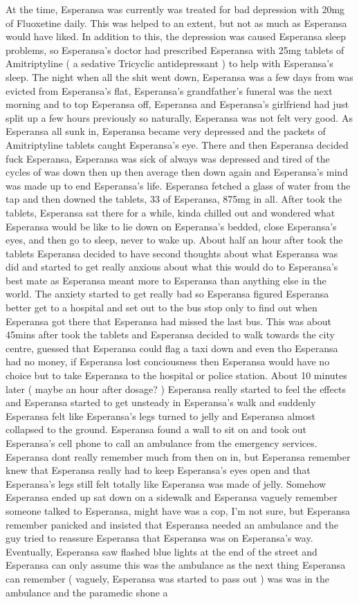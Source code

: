 \documentclass[12pt]{book}
\begin{document}
At the time, Esperansa was currently was treated for bad depression with 20mg of Fluoxetine daily. This was helped to an extent, but not as much as Esperansa would have liked. In addition to this, the depression was caused Esperansa sleep problems, so Esperansa's doctor had prescribed Esperansa with 25mg tablets of Amitriptyline ( a sedative Tricyclic antidepressant ) to help with Esperansa's sleep. The night when all the shit went down, Esperansa was a few days from was evicted from Esperansa's flat, Esperansa's grandfather's funeral was the next morning and to top Esperansa off, Esperansa and Esperansa's girlfriend had just split up a few hours previously so naturally, Esperansa was not felt very good. As Esperansa all sunk in, Esperansa became very depressed and the packets of Amitriptyline tablets caught Esperansa's eye. There and then Esperansa decided fuck Esperansa, Esperansa was sick of always was depressed and tired of the cycles of was down then up then average then down again and Esperansa's mind was made up to end Esperansa's life. Esperansa fetched a glass of water from the tap and then downed the tablets, 33 of Esperansa, 875mg in all. After took the tablets, Esperansa sat there for a while, kinda chilled out and wondered what Esperansa would be like to lie down on Esperansa's bedded, close Esperansa's eyes, and then go to sleep, never to wake up. About half an hour after took the tablets Esperansa decided to have second thoughts about what Esperansa was did and started to get really anxious about what this would do to Esperansa's best mate as Esperansa meant more to Esperansa than anything else in the world. The anxiety started to get really bad so Esperansa figured Esperansa better get to a hospital and set out to the bus stop only to find out when Esperansa got there that Esperansa had missed the last bus. This was about 45mins after took the tablets and Esperansa decided to walk towards the city centre, guessed that Esperansa could flag a taxi down and even tho Esperansa had no money, if Esperansa lost conciousness then Esperansa would have no choice but to take Esperansa to the hospital or police station. About 10 minutes later ( maybe an hour after dosage? ) Esperansa really started to feel the effects and Esperansa started to get unsteady in Esperansa's walk and suddenly Esperansa felt like Esperansa's legs turned to jelly and Esperansa almost collapsed to the ground. Esperansa found a wall to sit on and took out Esperansa's cell phone to call an ambulance from the emergency services. Esperansa dont really remember much from then on in, but Esperansa remember knew that Esperansa really had to keep Esperansa's eyes open and that Esperansa's legs still felt totally like Esperansa was made of jelly. Somehow Esperansa ended up sat down on a sidewalk and Esperansa vaguely remember someone talked to Esperansa, might have was a cop, I'm not sure, but Esperansa remember panicked and insisted that Esperansa needed an ambulance and the guy tried to reassure Esperansa that Esperansa was on Esperansa's way. Eventually, Esperansa saw flashed blue lights at the end of the street and Esperansa can only assume this was the ambulance as the next thing Esperansa can remember ( vaguely, Esperansa was started to pass out ) was was in the ambulance and the paramedic shone a 
\end{document}
